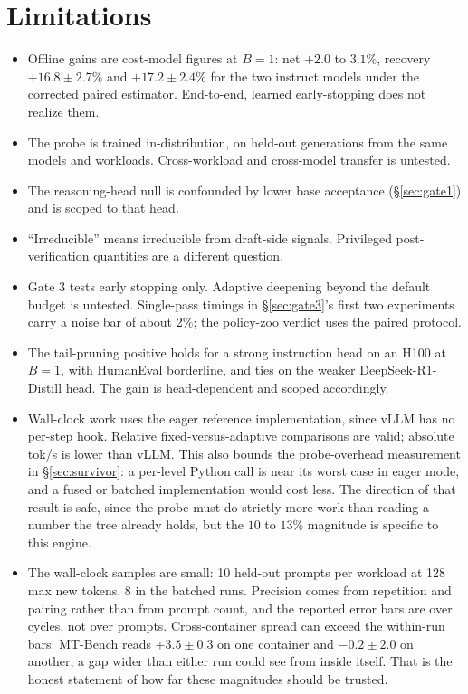 \documentclass[conference]{IEEEtran}
\begin{document}
\section{Limitations}
\begin{itemize}
\item Offline gains are cost-model figures at $B{=}1$: net $+2.0$ to $3.1\%$, recovery
$+16.8\pm2.7\%$ and $+17.2\pm2.4\%$ for the two instruct models under the corrected paired
estimator. End-to-end, learned early-stopping does not realize them.
\item The probe is trained in-distribution, on held-out generations from the same models and
workloads. Cross-workload and cross-model transfer is untested.
\item The reasoning-head null is confounded by lower base acceptance (\S\ref{sec:gate1}) and is
scoped to that head.
\item ``Irreducible'' means irreducible from draft-side signals. Privileged post-verification
quantities are a different question.
\item Gate 3 tests early stopping only. Adaptive deepening beyond the default budget is
untested. Single-pass timings in \S\ref{sec:gate3}'s first two experiments carry a noise bar
of about 2\%; the policy-zoo verdict uses the paired protocol.
\item The tail-pruning positive holds for a strong instruction head on an H100 at $B{=}1$, with
HumanEval borderline, and ties on the weaker DeepSeek-R1-Distill head. The gain is
head-dependent and scoped accordingly.
\item Wall-clock work uses the eager reference implementation, since vLLM has no per-step hook.
Relative fixed-versus-adaptive comparisons are valid; absolute tok/s is lower than vLLM. This
also bounds the probe-overhead measurement in \S\ref{sec:survivor}: a per-level Python call is
near its worst case in eager mode, and a fused or batched implementation would cost less. The
direction of that result is safe, since the probe must do strictly more work than reading a
number the tree already holds, but the $10$ to $13\%$ magnitude is specific to this engine.
\item The wall-clock samples are small: 10 held-out prompts per workload at 128 max new
tokens, 8 in the batched runs. Precision comes from repetition and pairing rather than from
prompt count, and the reported error bars are over cycles, not over prompts. Cross-container
spread can exceed the within-run bars: MT-Bench reads $+3.5\pm0.3$ on one container and
$-0.2\pm2.0$ on another, a gap wider than either run could see from inside itself. That is the
honest statement of how far these magnitudes should be trusted.
\end{itemize}
\end{document}
